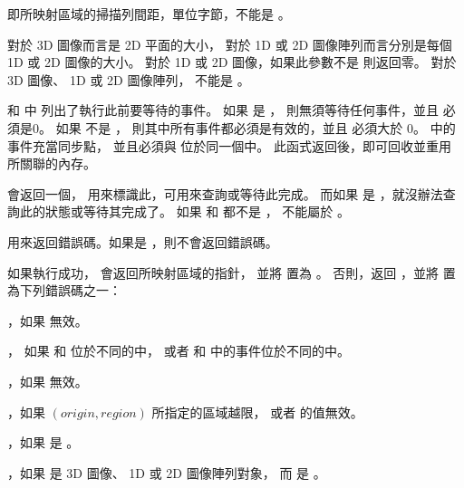  即所映射區域的掃描列間距，單位字節，不能是 。

 對於 3D 圖像而言是 2D 平面的大小，
對於 1D 或 2D 圖像陣列而言分別是每個 1D 或 2D 圖像的大小。
對於 1D 或 2D 圖像，如果此參數不是  則返回零。
對於 3D 圖像、 1D 或 2D 圖像陣列，  不能是 。

 和  中
列出了執行此前要等待的事件。
如果  是 ，
則無須等待任何事件，並且  必須是0。
如果  不是 ，
則其中所有事件都必須是有效的，並且  必須大於 0。
 中的事件充當同步點，
並且必須與  位於同一個中。
此函式返回後，即可回收並重用  所關聯的內存。

 會返回一個，
用來標識此，可用來查詢或等待此完成。
而如果  是 ，就沒辦法查詢此的狀態或等待其完成了。
如果  和  都不是 ，
 不能屬於 。

 用來返回錯誤碼。如果是 ，則不會返回錯誤碼。

如果執行成功，  會返回所映射區域的指針，
並將  置為 。
否則，返回 ，並將  置為下列錯誤碼之一：
\startigBase
\item {}，如果  無效。

\item {}，
如果  和  位於不同的中，
或者  和  中的事件位於不同的中。

\item {}，如果  無效。

\item {}，如果 $(origin, region)$ 所指定的區域越限，
或者  的值無效。

\item {}，如果  是 。

\item {}，如果  是 3D 圖像、 1D 或 2D 圖像陣列對象，
而  是 。

